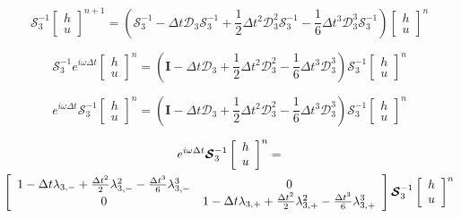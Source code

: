 \documentclass[12pt]{article}
\begin{document}
\[\boldsymbol{\mathcal{S}}_3^{-1}\left[\begin{array}{c}
h \\ u
\end{array}\right]^{n+1} = \left(\boldsymbol{\mathcal{S}}_3^{-1} -  \Delta t \boldsymbol{\mathcal{D}}_3 \boldsymbol{\mathcal{S}}_3^{-1}   + \frac{1}{2}\Delta t^2 \boldsymbol{\mathcal{D}}_3^2 \boldsymbol{\mathcal{S}}_3^{-1}- \frac{1}{6}\Delta t^3 \boldsymbol{\mathcal{D}}_3^3 \boldsymbol{\mathcal{S}}_3^{-1} \right) \left[\begin{array}{c}
h \\ u
\end{array}\right]^n\]

\[\boldsymbol{\mathcal{S}}_3^{-1} e^{i\omega \Delta t}\left[\begin{array}{c}
h \\ u
\end{array}\right]^{n} = \left(\boldsymbol{I} -  \Delta t \boldsymbol{\mathcal{D}}_3   + \frac{1}{2}\Delta t^2 \boldsymbol{\mathcal{D}}_3^2- \frac{1}{6}\Delta t^3 \boldsymbol{\mathcal{D}}_3^3 \right) \boldsymbol{\mathcal{S}}_3^{-1}\left[\begin{array}{c}
h \\ u
\end{array}\right]^n\]

\[e^{i\omega \Delta t}\boldsymbol{\mathcal{S}}_3^{-1}\left[\begin{array}{c}
h \\ u
\end{array}\right]^{n} = \left(\boldsymbol{I} -  \Delta t \boldsymbol{\mathcal{D}}_3   + \frac{1}{2}\Delta t^2 \boldsymbol{\mathcal{D}}_3^2- \frac{1}{6}\Delta t^3 \boldsymbol{\mathcal{D}}_3^3 \right) \boldsymbol{\mathcal{S}}_3^{-1}\left[\begin{array}{c}
h \\ u
\end{array}\right]^n\]

\begin{multline}
e^{i\omega \Delta t}\boldsymbol{\mathcal{S}}_3^{-1}\left[\begin{array}{c}
h \\ u
\end{array}\right]^{n} = \\ \left[\begin{array}{c c}
1 - \Delta t \lambda_{3,-} + \frac{\Delta t^2}{2} \lambda_{3,-}^2 - \frac{\Delta t^3}{6} \lambda_{3,-}^3  & 0 \\0  & 1 - \Delta t \lambda_{3,+} + \frac{\Delta t^2}{2} \lambda_{3,+}^2 - \frac{\Delta t^3}{6} \lambda_{3,+}^3
\end{array}\right] \boldsymbol{\mathcal{S}}_3^{-1}\left[\begin{array}{c}
h \\ u
\end{array}\right]^n
\end{multline}
\end{document}
